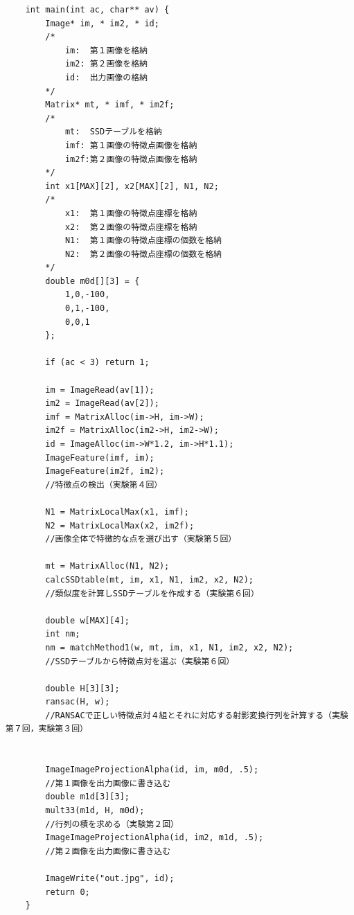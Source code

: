 \documentclass[11pt]{jarticle}
\begin{document}
\begin{lstlisting}
    int main(int ac, char** av) {
        Image* im, * im2, * id;
        /*
            im:  第１画像を格納
            im2: 第２画像を格納
            id:  出力画像の格納
        */
        Matrix* mt, * imf, * im2f;
        /*
            mt:  SSDテーブルを格納
            imf: 第１画像の特徴点画像を格納
            im2f:第２画像の特徴点画像を格納
        */
        int x1[MAX][2], x2[MAX][2], N1, N2;
        /*
            x1:  第１画像の特徴点座標を格納
            x2:  第２画像の特徴点座標を格納
            N1:  第１画像の特徴点座標の個数を格納
            N2:  第２画像の特徴点座標の個数を格納
        */
        double m0d[][3] = {
            1,0,-100,
            0,1,-100,
            0,0,1
        };
    
        if (ac < 3) return 1;
    
        im = ImageRead(av[1]);
        im2 = ImageRead(av[2]);
        imf = MatrixAlloc(im->H, im->W);
        im2f = MatrixAlloc(im2->H, im2->W);
        id = ImageAlloc(im->W*1.2, im->H*1.1);
        ImageFeature(imf, im);                             
        ImageFeature(im2f, im2);
        //特徴点の検出（実験第４回）

        N1 = MatrixLocalMax(x1, imf);
        N2 = MatrixLocalMax(x2, im2f);                      
        //画像全体で特徴的な点を選び出す（実験第５回）
    
        mt = MatrixAlloc(N1, N2);       
        calcSSDtable(mt, im, x1, N1, im2, x2, N2);          
        //類似度を計算しSSDテーブルを作成する（実験第６回）
    
        double w[MAX][4];
        int nm;
        nm = matchMethod1(w, mt, im, x1, N1, im2, x2, N2);  
        //SSDテーブルから特徴点対を選ぶ（実験第６回）

        double H[3][3];
        ransac(H, w);                                       
        //RANSACで正しい特徴点対４組とそれに対応する射影変換行列を計算する（実験第７回，実験第３回）
    
    
        ImageImageProjectionAlpha(id, im, m0d, .5);         
        //第１画像を出力画像に書き込む
        double m1d[3][3];
        mult33(m1d, H, m0d);                                
        //行列の積を求める（実験第２回）
        ImageImageProjectionAlpha(id, im2, m1d, .5);        
        //第２画像を出力画像に書き込む
    
        ImageWrite("out.jpg", id);
        return 0;
    }
\end{lstlisting}
\end{document}
